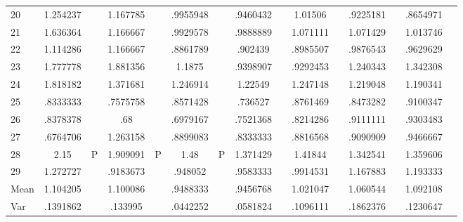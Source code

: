\documentclass[a4paper,12pt]{article}
\begin{document}
\begin{landscape}
\begin{footnotesize}
\begin{center}
\begin{longtable}{l|cc|cc|cc|cc|cc|cc|cc|}
20&1.254237&&1.167785&&.9955948&&.9460432&&1.01506&&.9225181&&.8654971& \\
21&1.636364&&1.166667&&.9929578&&.9888889&&1.071111&&1.071429&&1.013746& \\
22&1.114286&&1.166667&&.8861789&&.902439&&.8985507&&.9876543&&.9629629& \\
23&1.777778&&1.881356&&1.1875&&.9398907&&.9292453&&1.240343&&1.342308& \\
24&1.818182&&1.371681&&1.246914&&1.22549&&1.247148&&1.219048&&1.190341& \\
25&.8333333&&.7575758&&.8571428&&.736527&&.8761469&&.8473282&&.9100347& \\
26&.8378378&&.68&&.6979167&&.7521368&&.8214286&&.9111111&&.9303483& \\
27&.6764706&&1.263158&&.8899083&&.8333333&&.8816568&&.9090909&&.9466667& \\
28&2.15&P&1.909091&P&1.48&P&1.371429&&1.41844&&1.342541&&1.359606& \\
29&1.272727&&.9183673&&.948052&&.9583333&&.9914531&&1.167883&&1.193333& \\ \hline
Mean&1.104205&&1.100086&&.9488333&&.9456768&&1.021047&&1.060544&&1.092108& \\
Var&.1391862&&.133995&&.0442252&&.0581824&&.1096111&&.1862376&&.1230647& \\ \hline
\end{longtable}
\end{center}
\end{footnotesize}
\end{landscape}
\end{document}
